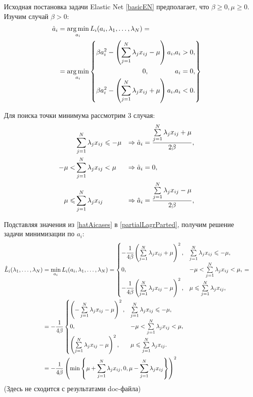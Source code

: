 Исходная постановка задачи Elastic Net \ref{basicEN} предполагает, что $\beta\ge0, \mu\ge0.$ Изучим случай $\beta > 0:$ 
\begin{equation}
	\label{hatAi}
	\begin{split}
		\hat a_i &= \mathop{\mbox{arg\ \!min}}\limits_{a_i} L_i(a_i,\lambda_{1},\ldots,\lambda_{N}) = \\
				 &=	\mathop{\mbox{arg\ \!min}}\limits_{a_i} \left\{
				 	\begin{aligned}
						\beta a_i^2 - \left(\sum\limits_{j=1}^N\lambda_jx_{ij}-\mu\right)a_i, &a_i > 0,\\
						0, \qquad\qquad &a_i = 0,\\
						\beta a_i^2 - \left(\sum\limits_{j=1}^N\lambda_jx_{ij}+\mu\right)a_i, &a_i < 0.\\
					\end{aligned}	
					\right\}
	\end{split}
\end{equation}

Для поиска точки минимума рассмотрим 3 случая:
\begin{align}
	\label{hatAicases}
	         &\sum\limits_{j=1}^N\lambda_jx_{ij} \leqslant -\mu 	&\Rightarrow \hat a_i &= \frac{\sum\limits_{j=1}^N\lambda_jx_{ij}+\mu}{2\beta}, \\
	-\mu <   &\sum\limits_{j=1}^N\lambda_jx_{ij} < \mu 	&\Rightarrow \hat a_i &= 0, \\
	\mu \leqslant &\sum\limits_{j=1}^N\lambda_jx_{ij} 			&\Rightarrow \hat a_i &= \frac{\sum\limits_{j=1}^N\lambda_jx_{ij}-\mu}{2\beta},
\end{align}


Подставляя значения из \ref{hatAicases} в \ref{partialLagrParted}, получим решение задачи минимизации по $a_i$:
\begin{align}
	\label{hatLiSquared}
	\begin{split}
		\hat L_i(\lambda_{1},\ldots,\lambda_{N}) &= \mathop{\mbox{min}}\limits_{a_i}L_i(a_i, \lambda_{1},\ldots,\lambda_{N}) =
		\begin{cases}
			-\cfrac1{4\beta}\left(\sum\limits_{j=1}^N\lambda_jx_{ij}+\mu\right)^2, &\sum\limits_{j=1}^N\lambda_jx_{ij} \leqslant -\mu,\\
			0, 										&-\mu < \sum\limits_{j=1}^N\lambda_jx_{ij} < \mu,\\
			-\cfrac1{4\beta}\left(\sum\limits_{j=1}^N\lambda_jx_{ij}-\mu\right)^2, &\mu\leqslant\sum\limits_{j=1}^N\lambda_jx_{ij},
		\end{cases} = \\
		&= -\frac1{4\beta}
		\begin{cases}
			\left(-\sum\limits_{j=1}^N\lambda_jx_{ij}-\mu\right)^2, &\sum\limits_{j=1}^N\lambda_jx_{ij} \leqslant -\mu,\\
			0, 	 					&-\mu < \sum\limits_{j=1}^N\lambda_jx_{ij} < \mu,\\
			\left(\sum\limits_{j=1}^N\lambda_jx_{ij}-\mu\right)^2, &\mu\leqslant\sum\limits_{j=1}^N\lambda_jx_{ij}.
		\end{cases} 	\\
		&= -\frac1{4\beta} \left(\mathop{\mbox{min}}\limits\left\{\mu + \sum\limits_{j=1}^N\lambda_jx_{ij}, 0, \mu-\sum\limits_{j=1}^N\lambda_jx_{ij}\right\}\right)^2
	\end{split}
\end{align}
(Здесь не сходится с результатами doc-файла)

